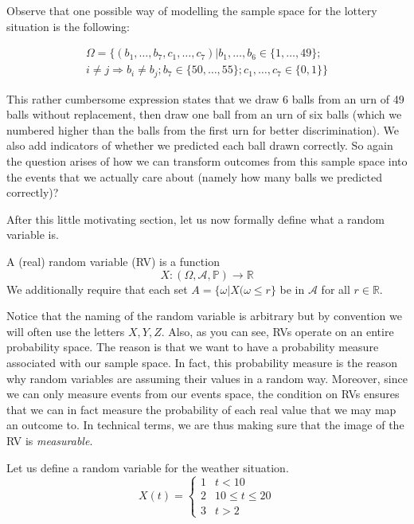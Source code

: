 \documentclass[a4paper,11pt,leqno]{report}
\begin{document}
Observe that one possible way of modelling the sample space for the lottery situation is the following:

\begin{align}
\Omega = \{(b_{1}, \ldots, b_{7}, c_{1}, \ldots, c_{7})| b_{1}, \ldots, b_{6} \in \{1,\ldots, 49\}; \\
i \not = j \Rightarrow b_{i} \not = b_{j};
b_{7} \in \{50, \ldots, 55\}; c_{1}, \ldots, c_{7} \in \{0,1\} \} \nonumber
\end{align}

This rather cumbersome expression states that we draw 6 balls from an urn of 49 balls without replacement,
then draw one ball from an urn of six balls (which we numbered higher than the balls from the first
urn for better discrimination). We also add indicators of whether we predicted each ball drawn correctly.
So again the question arises of how we can transform outcomes from this sample space into
the events that we actually care about (namely how many balls we predicted correctly)?

After this little motivating section, let us now formally define what a random variable is.

\begin{Definition} 
A (real) random variable (RV) is a function
$$ X: (\Omega, \mathcal{A}, \mathbb{P}) \rightarrow \mathbb{R} $$
We additionally require that each set $ A = \{\omega| X(\omega \leq r\} $ be in $ \mathcal{A} $ for
all $ r \in \mathbb{R} $.
\end{Definition}

Notice that the naming of the random variable is arbitrary but by convention we will often use the letters
$ X,Y,Z $. Also, as you can see, RVs operate on an entire probability space. The reason is that
we want to have a probability measure associated with our sample space. 
In fact, this probability measure is the reason why random variables are assuming their values
in a random way. Moreover, since we can only measure events from our events space, the condition on RVs
ensures that we can in fact measure the probability of each real value that we may map an outcome to.
In technical terms, we are thus making sure that the image of the RV is \textit{measurable}.

Let us define a random variable for the weather situation. 
\begin{equation} \label{weatherRV}
X(t) = 
\begin{cases}
1 & t < 10 \\
2 & 10 \leq t \leq 20 \\
3 & t > 2
\end{cases}
\end{equation}
\end{document}
